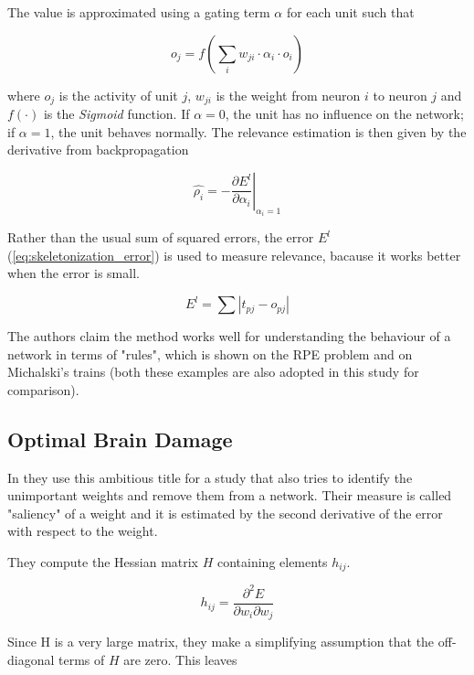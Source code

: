 The value is approximated using a gating term $ \alpha $ for each unit such that

\begin{equation}
o_j = f(\displaystyle{\sum_i w_{ji} \cdot \alpha_i \cdot o_i})
\end{equation}

where $ o_j $ is the activity of unit $ j $, $ w_{ji} $ is the weight from neuron $ i $ to neuron $ j $ and $ f(\cdot) $ is the \textit{Sigmoid} function. If $ \alpha = 0 $, the unit has no influence on the network; if $ \alpha = 1 $, the unit behaves normally. The relevance estimation is then given by the derivative from backpropagation

\begin{equation}
\hat{\rho_i} = - \left.\frac{\partial E^l}{\partial \alpha_i}\right\rvert_{\alpha_i = 1}
\end{equation}

Rather than the usual sum of squared errors, the error $ E^l $ (\cref{eq:skeletonization_error}) is used to measure relevance, bacause it works better when the error is small.

\begin{equation} \label{eq:skeletonization_error}
E^l = \sum |t_{pj} - o_{pj}|
\end{equation}

The authors claim the method works well for understanding the behaviour of a network in terms of "rules", which is shown on the RPE problem and on Michalski's trains (both these examples are also adopted in this study for comparison).

\subsection*{Optimal Brain Damage} \label{ssec:optimal_brain_damage}
In \citep{lecun:obd} they use this ambitious title for a study that also tries to identify the unimportant weights and remove them from a network. Their measure is called "saliency" of a weight and it is estimated by the second derivative of the error with respect to the weight.

They compute the Hessian matrix $ H $ containing elements $ h_{ij} $.

\begin{equation}
h_{ij} = \frac{\partial^2 E}{\partial w_i \partial w_j}
\end{equation}

Since H is a very large matrix, they make a simplifying assumption that the off-diagonal terms of $ H $ are zero. This leaves

